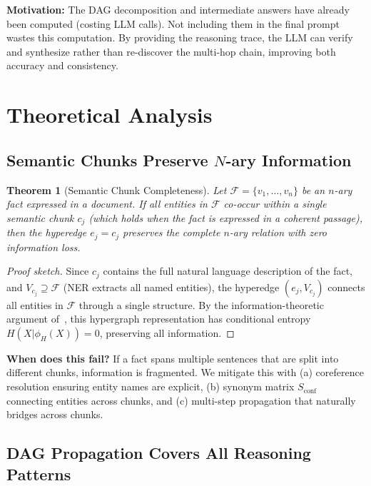\documentclass[11pt,a4paper]{article}
\newtheorem{theorem}{Theorem}
\begin{document}
\textbf{Motivation:} The DAG decomposition and intermediate answers have already been computed (costing LLM calls). Not including them in the final prompt wastes this computation. By providing the reasoning trace, the LLM can verify and synthesize rather than re-discover the multi-hop chain, improving both accuracy and consistency.


\section{Theoretical Analysis}

\subsection{Semantic Chunks Preserve $N$-ary Information}

\begin{theorem}[Semantic Chunk Completeness]
Let $\mathcal{F} = \{v_1, \ldots, v_n\}$ be an $n$-ary fact expressed in a document. If all entities in $\mathcal{F}$ co-occur within a single semantic chunk $c_j$ (which holds when the fact is expressed in a coherent passage), then the hyperedge $e_j = c_j$ preserves the complete $n$-ary relation with zero information loss.
\end{theorem}

\begin{proof}[Proof sketch]
Since $c_j$ contains the full natural language description of the fact, and $V_{c_j} \supseteq \mathcal{F}$ (NER extracts all named entities), the hyperedge $(e_j, V_{c_j})$ connects all entities in $\mathcal{F}$ through a single structure. By the information-theoretic argument of~\cite{luo2025hypergraphrag}, this hypergraph representation has conditional entropy $H(X | \phi_H(X)) = 0$, preserving all information.
\end{proof}

\textbf{When does this fail?} If a fact spans multiple sentences that are split into different chunks, information is fragmented. We mitigate this with (a) coreference resolution ensuring entity names are explicit, (b) synonym matrix $S_{\text{conf}}$ connecting entities across chunks, and (c) multi-step propagation that naturally bridges across chunks.

\subsection{DAG Propagation Covers All Reasoning Patterns}
\end{document}
